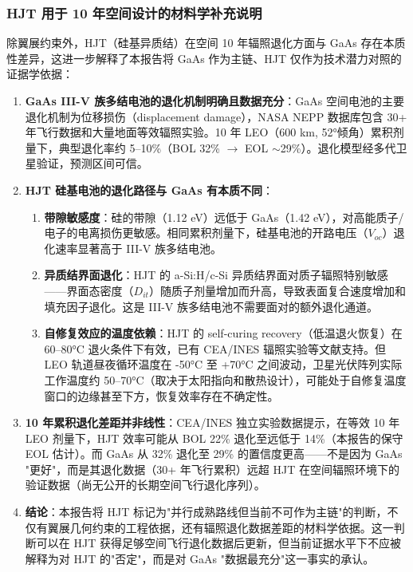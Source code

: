 \subsubsection{HJT 用于 10 年空间设计的材料学补充说明}

除翼展约束外，HJT（硅基异质结）在空间 10 年辐照退化方面与 GaAs 存在本质性差异，这进一步解释了本报告将 GaAs 作为主链、HJT 仅作为技术潜力对照的证据学依据：

\begin{enumerate}[leftmargin=*]
    \item \textbf{GaAs III-V 族多结电池的退化机制明确且数据充分}：GaAs 空间电池的主要退化机制为位移损伤（displacement damage），NASA NEPP 数据库包含 30+ 年飞行数据和大量地面等效辐照实验。10 年 LEO（600 km, 52°倾角）累积剂量下，典型退化率约 5--10\%（BOL 32\% $\to$ EOL $\sim$29\%）。退化模型经多代卫星验证，预测区间可信。
    \item \textbf{HJT 硅基电池的退化路径与 GaAs 有本质不同}：
    \begin{enumerate}
        \item \textbf{带隙敏感度}：硅的带隙（1.12 eV）远低于 GaAs（1.42 eV），对高能质子/电子的电离损伤更敏感。相同累积剂量下，硅基电池的开路电压（$V_{oc}$）退化速率显著高于 III-V 族多结电池。
        \item \textbf{异质结界面退化}：HJT 的 a-Si:H/c-Si 异质结界面对质子辐照特别敏感——界面态密度（$D_{it}$）随质子剂量增加而升高，导致表面复合速度增加和填充因子退化。这是 III-V 族多结电池不需要面对的额外退化通道。
        \item \textbf{自修复效应的温度依赖}：HJT 的 self-curing recovery（低温退火恢复）在 60--80°C 退火条件下有效，已有 CEA/INES 辐照实验等文献支持。但 LEO 轨道昼夜循环温度在 -50°C 至 +70°C 之间波动，卫星光伏阵列实际工作温度约 50--70°C（取决于太阳指向和散热设计），可能处于自修复温度窗口的边缘甚至下方，恢复效率存在不确定性。
    \end{enumerate}
    \item \textbf{10 年累积退化差距并非线性}：CEA/INES 独立实验数据提示，在等效 10 年 LEO 剂量下，HJT 效率可能从 BOL 22\% 退化至远低于 14\%（本报告的保守 EOL 估计）。而 GaAs 从 32\% 退化至 29\% 的置信度更高——不是因为 GaAs "更好"，而是其退化数据（30+ 年飞行累积）远超 HJT 在空间辐照环境下的验证数据（尚无公开的长期空间飞行退化序列）。
    \item \textbf{结论}：本报告将 HJT 标记为"并行成熟路线但当前不可作为主链"的判断，不仅有翼展几何约束的工程依据，还有辐照退化数据差距的材料学依据。这一判断可以在 HJT 获得足够空间飞行退化数据后更新，但当前证据水平下不应被解释为对 HJT 的"否定"，而是对 GaAs "数据最充分"这一事实的承认。
\end{enumerate}

